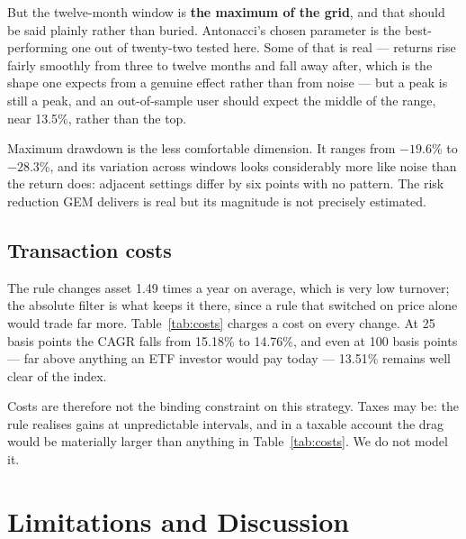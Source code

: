 \documentclass[11pt,a4paper]{article}
\let\oldsubsection\subsection
\renewcommand{\subsection}{\FloatBarrier\oldsubsection}
\let\oldsection\section
\renewcommand{\section}{\FloatBarrier\oldsection}
\begin{document}
\begin{table}[!ht]
  \centering
  \caption{Robustness to the momentum lookback window.}
  \label{tab:lookback}
  
\end{table}

But the twelve-month window is \textbf{the maximum of the grid}, and that
should be said plainly rather than buried. Antonacci's chosen parameter is the
best-performing one out of twenty-two tested here. Some of that is real ---
returns rise fairly smoothly from three to twelve months and fall away after,
which is the shape one expects from a genuine effect rather than from noise ---
but a peak is still a peak, and an out-of-sample user should expect the middle
of the range, near 13.5\%, rather than the top.

Maximum drawdown is the less comfortable dimension. It ranges from $-19.6$\% to
$-28.3$\%, and its variation across windows looks considerably more like noise
than the return does: adjacent settings differ by six points with no pattern.
The risk reduction GEM delivers is real but its magnitude is not precisely
estimated.

\subsection{Transaction costs}

The rule changes asset 1.49 times a year on average, which is very low
turnover; the absolute filter is what keeps it there, since a rule that
switched on price alone would trade far more. Table~\ref{tab:costs} charges a
cost on every change. At 25 basis points the CAGR falls from 15.18\% to
14.76\%, and even at 100 basis points --- far above anything an ETF investor
would pay today --- 13.51\% remains well clear of the index.

\begin{table}[!ht]
  \centering
  \caption{Robustness to transaction costs.}
  \label{tab:costs}
  
\end{table}

Costs are therefore not the binding constraint on this strategy. Taxes may
be: the rule realises gains at unpredictable intervals, and in a taxable
account the drag would be materially larger than anything in
Table~\ref{tab:costs}. We do not model it.

\section{Limitations and Discussion}
\label{sec:limitations}
\end{document}
